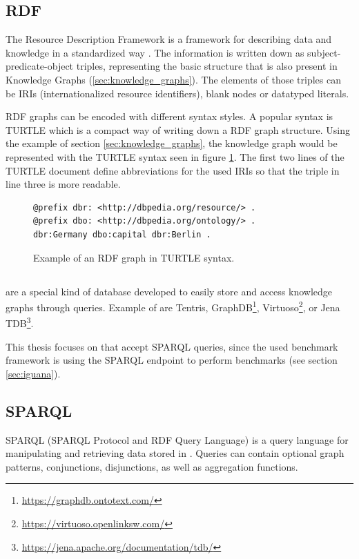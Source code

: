 \subsection{RDF}
The Resource Description Framework is a framework for describing data and knowledge in a standardized way \cite{RDFConceptsAbstract}.
The information is written down as subject-predicate-object triples, representing the basic structure that is also present in Knowledge Graphs (\ref{sec:knowledge_graphs}).
The elements of those triples can be IRIs (internationalized resource identifiers), blank nodes or datatyped literals.

RDF graphs can be encoded with different syntax styles.
A popular syntax is TURTLE \cite{RDFTurtle} which is a compact way of writing down a RDF graph structure.
Using the example of section \ref{sec:knowledge_graphs}, the knowledge graph would be represented with the TURTLE syntax seen in figure \ref{fig:rdf_turtle}.
The first two lines of the TURTLE document define abbreviations for the used IRIs so that the triple in line three is more readable.

\begin{figure}[tbph]
	\begin{lstlisting}
@prefix dbr: <http://dbpedia.org/resource/> .
@prefix dbo: <http://dbpedia.org/ontology/> .
dbr:Germany dbo:capital dbr:Berlin .
	\end{lstlisting}
	\caption{Example of an RDF graph in TURTLE syntax.}
	\label{fig:rdf_turtle}
\end{figure}


\subsection{\ts{}}
\label{sec:triplestores}
\tsp{} are a special kind of database developed to easily store and access knowledge graphs through queries.
Example of \tsp{} are Tentris\cite{bigerlTentrisTensorBasedTriple2020}, GraphDB\footnote{\url{https://graphdb.ontotext.com/}}, Virtuoso\footnote{\url{https://virtuoso.openlinksw.com/}}, or Jena TDB\footnote{\url{https://jena.apache.org/documentation/tdb/}}.

This thesis focuses on \tsp{} that accept SPARQL queries, since the used benchmark framework \iguana{} is using the SPARQL endpoint to perform benchmarks (see section \ref{sec:iguana}).


\subsection{SPARQL}
\label{sec:sparql}
SPARQL (SPARQL Protocol and RDF Query Language)\cite{harrisSPARQLQueryLanguage} is a query language for manipulating and retrieving data stored in \tsp{}.
Queries can contain optional graph patterns, conjunctions, disjunctions, as well as aggregation functions.


